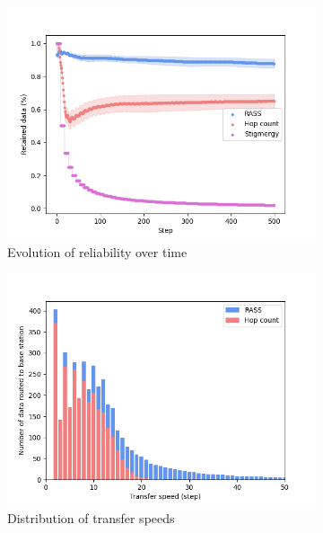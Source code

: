 \documentclass[sigconf]{aamas}
\begin{document}
\begin{figure}
    \centering
    \begin{subfigure}{0.30\textwidth}
        \includegraphics[width=\textwidth]{figures/random_reliability.png}
        \caption{Evolution of reliability over time}
        \label{results:random_100_reliability}
    \end{subfigure}
    \begin{subfigure}{0.30\textwidth}
        \includegraphics[width=\textwidth]{figures/random_speed.png}
        \caption{Distribution of transfer speeds}
        \label{results:random_100_speed}
    \end{subfigure}
    \begin{subfigure}{0.30\textwidth}

\end{subfigure}
\end{figure}
\end{document}
